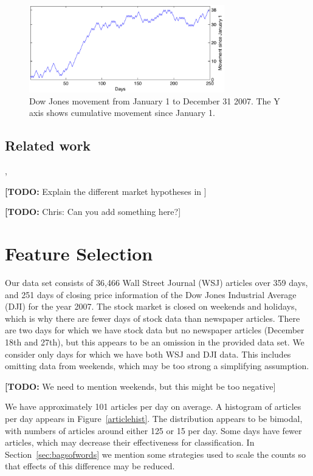 \documentclass[10pt, twocolumn]{article}
\def\TODO#1{\noindent\textbf{[TODO:} #1]}
\begin{document}
\begin{figure}
\includegraphics[width=8.5cm]{experiments/dj_performance.pdf}
\caption{Dow Jones movement from January 1 to December 31 2007. The Y axis shows cumulative movement since January 1.}
\label{fig:dj-preformance}
\end{figure}

\subsection{Related work}
\cite{twitter}, \cite{mlstockmarket}

\TODO{Explain the different market hypotheses in \cite{mlstockmarket}}

\TODO{Chris: Can you add something here?}

\section{Feature Selection}
\label{sec:features}

Our data set consists of 36,466 Wall Street Journal (WSJ) articles over 359 days, and 251 days of closing price information of the Dow Jones Industrial Average (DJI) for the year 2007. The stock market is closed on weekends and holidays, which is why there are fewer days of stock data than newspaper articles. There are two days for which we have stock data but no newspaper articles (December 18th and 27th), but this appears to be an omission in the provided data set. We consider only days for which we have both WSJ and DJI data. This includes omitting data from weekends, which may be too strong a simplifying assumption.

\TODO{We need to mention weekends, but this might be too negative}

We have approximately 101 articles per day on average. A histogram of articles per day appears in Figure~\ref{articlehist}. The distribution appears to be bimodal, with numbers of articles around either 125 or 15 per day. Some days have fewer articles, which may decrease their effectiveness for classification. In Section~\ref{sec:bagsofwords} we mention some strategies used to scale the counts so that effects of this difference may be reduced.
\end{document}
